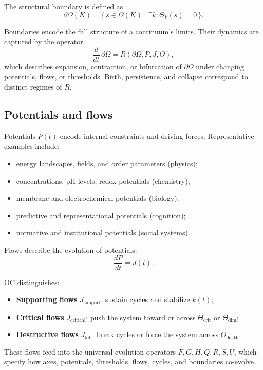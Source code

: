 The structural boundary is defined as
\[
\partial\Omega(K) = \{\, s\in\Omega(K) \mid \exists k: \Theta_k(s)=0 \,\}.
\]

Boundaries encode the full structure of a continuum’s limits.  
Their dynamics are captured by the operator
\[
\frac{d}{dt}\,\partial\Omega = R(\partial\Omega, P, J, \Theta),
\]
which describes expansion, contraction, or bifurcation of \(\partial\Omega\) under changing potentials, flows, or thresholds.  
Birth, persistence, and collapse correspond to distinct regimes of \(R\).

\subsection{Potentials and flows}

Potentials \(P(t)\) encode internal constraints and driving forces.  
Representative examples include:

\begin{itemize}
    \item energy landscapes, fields, and order parameters (physics);
    \item concentrations, pH levels, redox potentials (chemistry);
    \item membrane and electrochemical potentials (biology);
    \item predictive and representational potentials (cognition);
    \item normative and institutional potentials (social systems).
\end{itemize}

Flows describe the evolution of potentials:
\[
\frac{dP}{dt} = J(t).
\]

OC distinguishes:

\begin{itemize}
    \item \textbf{Supporting flows} \(J_{\mathrm{support}}\): sustain cycles and stabilize \(k(t)\);
    \item \textbf{Critical flows} \(J_{\mathrm{critical}}\): push the system toward or across \(\Theta_{\mathrm{crit}}\) or \(\Theta_{\mathrm{dim}}\);
    \item \textbf{Destructive flows} \(J_{\mathrm{kill}}\): break cycles or force the system across \(\Theta_{\mathrm{death}}\).
\end{itemize}

These flows feed into the universal evolution operators \(F, G, H, Q, R, S, U\), which specify how axes, potentials, thresholds, flows, cycles, and boundaries co-evolve.

